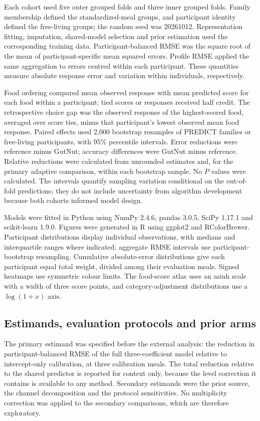\documentclass[pdflatex,sn-nature]{sn-jnl}
\theoremstyle{thmstyleone}
\theoremstyle{thmstyletwo}
\theoremstyle{thmstylethree}
\begin{document}
Each cohort used five outer grouped folds and three inner grouped folds. Family membership defined the standardized-meal groups, and participant identity defined the free-living groups; the random seed was 20261012. Representation fitting, imputation, shared-model selection and prior estimation used the corresponding training data. Participant-balanced RMSE was the square root of the mean of participant-specific mean squared errors. Profile RMSE applied the same aggregation to errors centred within each participant. These quantities measure absolute response error and variation within individuals, respectively.

Food ordering compared mean observed response with mean predicted score for each food within a participant; tied scores or responses received half credit. The retrospective choice gap was the observed response of the highest-scored food, averaged over score ties, minus that participant's lowest observed mean food response. Paired effects used 2,000 bootstrap resamples of PREDICT families or free-living participants, with 95\% percentile intervals. Error reductions were reference minus GutNut; accuracy differences were GutNut minus reference. Relative reductions were calculated from unrounded estimates and, for the primary adaptive comparison, within each bootstrap sample. No $P$ values were calculated. The intervals quantify sampling variation conditional on the out-of-fold predictions; they do not include uncertainty from algorithm development because both cohorts informed model design.

Models were fitted in Python using NumPy 2.4.6, pandas 3.0.5, SciPy 1.17.1 and scikit-learn 1.9.0. Figures were generated in R using ggplot2 and RColorBrewer. Participant distributions display individual observations, with medians and interquartile ranges where indicated; aggregate RMSE intervals use participant-bootstrap resampling. Cumulative absolute-error distributions give each participant equal total weight, divided among their evaluation meals. Signed heatmaps use symmetric colour limits. The food-score atlas uses an asinh scale with a width of three score points, and category-adjustment distributions use a $\log(1+x)$ axis.

\subsection{Estimands, evaluation protocols and prior arms}

The primary estimand was specified before the external analysis: the reduction in
participant-balanced RMSE of the full three-coefficient model relative to intercept-only
calibration, at three calibration meals. The total reduction relative to the shared predictor is
reported for context only, because the level correction it contains is available to any method.
Secondary estimands were the prior source, the channel decomposition and the protocol
sensitivities. No multiplicity correction was applied to the secondary comparisons, which are
therefore exploratory.
\end{document}
